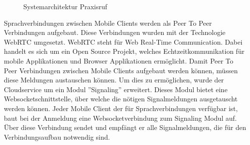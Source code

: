 \begin{figure}[h]
    \centering
    \begin{minipage}[b]{0.75\textwidth}
        \caption{Systemarchitektur Praxisruf}
    \end{minipage}
\end{figure}

Sprachverbindungen zwischen Mobile Clients werden als Peer To Peer Verbindungen aufgebaut.
Diese Verbindungen wurden mit der Technologie WebRTC umgesetzt.
WebRTC steht für Web Real-Time Communication.
Dabei handelt es sich um ein Open Source Projekt, welches Echtzeitkommunikation für mobile Applikationen und Browser Applikationen ermöglicht.
Damit Peer To Peer Verbindungen zwischen Mobile Clients aufgebaut werden können, müssen diese Meldungen austauschen können.
Um dies zu ermöglichen, wurde der Cloudservice um ein Modul ''Signaling'' erweitert.
Dieses Modul bietet eine Websocketschnittstelle, über welche die nötigen Signalmeldungen ausgetauscht werden können.
Jeder Mobile Client der für Sprachverbindungen verfügbar ist, baut bei der Anmeldung eine Websocketverbindung zum Signaling Modul auf.
Über diese Verbindung sendet und empfängt er alle Signalmeldungen, die für den Verbindungsaufbau notwendig sind.

